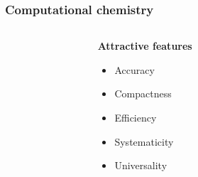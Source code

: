 \begin{frame}
    \frametitle{Computational chemistry}
    \begin{columns}
    \begin{column}{.10\textwidth}
    \end{column}
    \begin{column}{.30\textwidth}
    \textbf{Attractive features}
    \begin{itemize}
        \item Accuracy
        \item Compactness
        \item Efficiency
        \item Systematicity
        \item Universality
    \end{itemize}
    \vspace{0.3mm}
    \end{column}
    \begin{column}{.60\textwidth}

    \vspace{5mm}

    \end{column}
    \end{columns}    

    \vspace{40.2mm}

\end{frame}

